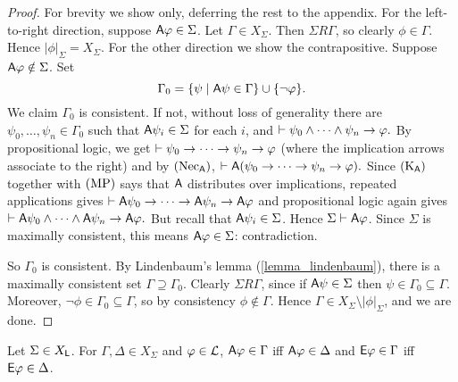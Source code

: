 \begin{proof}
      For brevity we show  only, deferring the rest to
      the appendix.
      For the left-to-right direction, suppose $\mathsf{A}\varphi \in \Sigma$. Let
      $\Gamma \in X_\Sigma$. Then $\Sigma R \Gamma$, so clearly $\phi
      \in \Gamma$. Hence $|\phi|_\Sigma = X_\Sigma$.
      For the other direction we show the contrapositive. Suppose
      $\mathsf{A}\varphi \notin \Sigma$. Set
      \[
        \Gamma_0 = \{\psi \mid \mathsf{A}\psi \in \Gamma\} \cup \{\neg\varphi\}.
      \]
      We claim $\Gamma_0$ is consistent. If not, without loss of
      generality there are $\psi_0, \ldots, \psi_n \in \Gamma_0$ such
      that $\mathsf{A}\psi_i \in \Sigma$ for each $i$, and
      $
        \vdash \psi_0 \land \cdots \land \psi_n \to \varphi.
      $
      By propositional logic, we get
      $
          \vdash \psi_0 \to \cdots \to \psi_n \to
          \varphi
      $
      (where the implication arrows associate to the right) and by
      $(\text{Nec}_{\mathsf{A}})$,
      $
          \vdash \mathsf{A}(\psi_0 \to \cdots \to \psi_n \to
          \varphi).
      $
      Since $(\text{K}_{\mathsf{A}})$ together with $(\text{MP})$ says that $\mathsf{A}$ distributes
      over implications, repeated applications gives
      $
        \vdash \mathsf{A}\psi_0 \to \cdots \to \mathsf{A}\psi_n \to
        \mathsf{A}\varphi
      $
      and propositional logic again gives
      $
          \vdash \mathsf{A}\psi_0 \land \cdots \land \mathsf{A}\psi_n \to \mathsf{A}\varphi.
      $
      But recall that $\mathsf{A}\psi_i \in \Sigma$. Hence $\Sigma \vdash
      \mathsf{A}\varphi$. Since $\Sigma$ is maximally consistent, this means
      $\mathsf{A}\varphi \in \Sigma$: contradiction.

      So $\Gamma_0$ is consistent. By Lindenbaum's lemma
      (\cref{lemma_lindenbaum}), there is a maximally consistent set
      $\Gamma \supseteq \Gamma_0$. Clearly $\Sigma R \Gamma$, since if
      $\mathsf{A}\psi \in \Sigma$ then $\psi \in \Gamma_0 \subseteq \Gamma$.
      Moreover, $\neg\phi \in \Gamma_0 \subseteq \Gamma$, so by
      consistency $\phi \notin \Gamma$. Hence $\Gamma \in X_\Sigma
      \setminus |\phi|_\Sigma$, and we are done.
\end{proof}

\begin{corollary}
\label{cor_xsigma_agree_on_ae}
    Let $\Sigma \in X_{\mathsf{L}}$. For $\Gamma, \Delta \in X_\Sigma$ and $\varphi \in
    \mathcal{L}$, $\mathsf{A}\varphi \in \Gamma$ iff $\mathsf{A}\varphi \in \Delta$ and $\mathsf{E}\varphi \in \Gamma$
    iff $\mathsf{E}\varphi \in \Delta$.
\end{corollary}

